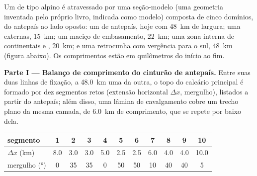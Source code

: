 \begin{problem}\label{pb:b2:alpine-orogen:1}
Um  de tipo alpino é atravessado por uma seção-modelo (uma geometria inventada pelo próprio livro,
indicada como modelo) composta de cinco domínios, do antepaís ao lado oposto:
um  de antepaís, hoje com \qty{48}{km} de largura; uma  externas, \qty{15}{km};
um maciço de embasamento, \qty{22}{km}; uma zona interna de  continentais e ,
\qty{20}{km}; e uma retrocunha com vergência para o sul, \qty{48}{km}
(figura abaixo). Os comprimentos estão em quilômetros do início ao fim.

\begin{omfigure}
\centering
{}
\par{}
\end{omfigure}

\noindent\textbf{Parte I --- Balanço de comprimento do cinturão de antepaís.} Entre suas duas linhas
de fixação, a \qty{48.0}{km} uma da outra, o topo do calcário principal é formado por dez segmentos retos
(extensão horizontal $\Delta x$, mergulho), listados a partir do antepaís; além disso, uma lâmina de cavalgamento
cobre um trecho plano da mesma camada, de \qty{6.0}{km} de comprimento, que se repete por baixo dela.

\smallskip
\begin{center}\small
\begin{tabular}{l|cccccccccc}
segmento & 1 & 2 & 3 & 4 & 5 & 6 & 7 & 8 & 9 & 10\\ \hline
$\Delta x$ (\unit{km}) & 8.0 & 3.0 & 3.0 & 5.0 & 2.5 & 2.5 & 6.0 & 4.0 & 4.0 & 10.0\\
mergulho (\unit{\degree}) & 0 & 35 & 35 & 0 & 50 & 50 & 10 & 40 & 40 & 5
\end{tabular}
\end{center}
\smallskip


\end{problem}
